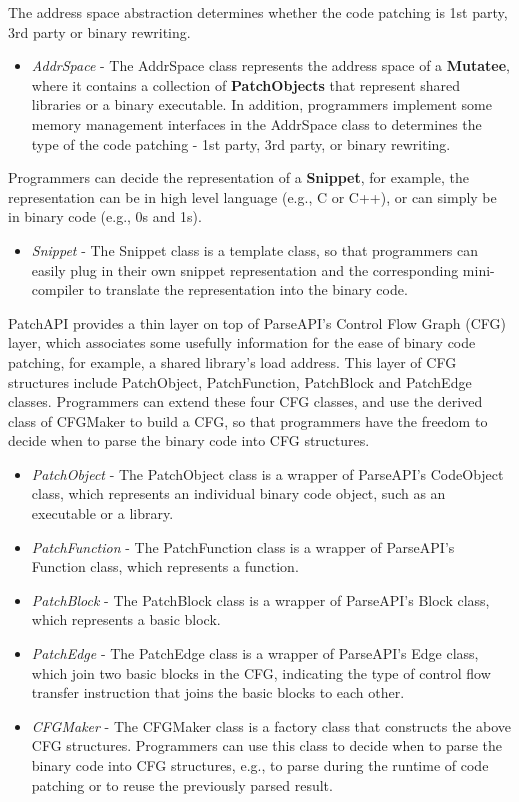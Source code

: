 \documentclass[11pt]{article}
\begin{document}
The address space abstraction determines whether the code patching is 1st party,
3rd party or binary rewriting.
\begin{itemize}
\item \emph{AddrSpace} - The AddrSpace class represents the address space of a
    \textbf{Mutatee}, where it contains a collection of \textbf{PatchObjects} that represent
    shared libraries or a binary executable. In addition, programmers implement
    some memory management interfaces in the AddrSpace class to determines the
    type of the code patching - 1st party, 3rd party, or binary rewriting.
\end{itemize}
Programmers can decide the representation of a \textbf{Snippet}, for example, the
representation can be in high level language (e.g., C or C++), or can simply be
in binary code (e.g., 0s and 1s).
\begin{itemize}
\item \emph{Snippet} - The Snippet class is a template class, so that programmers can
    easily plug in their own snippet representation and the corresponding
    mini-compiler to translate the representation into the binary code.
\end{itemize}
PatchAPI provides a thin layer on top of ParseAPI's Control Flow Graph (CFG)
layer, which associates some usefully information for the ease of binary code
patching, for example, a shared library's load address. This layer of CFG
structures include PatchObject, PatchFunction, PatchBlock and PatchEdge classes.
Programmers can extend these four CFG classes, and use the derived class of
CFGMaker to build a CFG, so that programmers have the freedom to decide when to
parse the binary code into CFG structures.
\begin{itemize}
\item \emph{PatchObject} - The PatchObject class is a wrapper of ParseAPI's CodeObject
    class, which represents an individual binary code object, such as an
    executable or a library.
\item \emph{PatchFunction} - The PatchFunction class is a wrapper of ParseAPI's
    Function class, which represents a function.
\item \emph{PatchBlock} - The PatchBlock class is a wrapper of ParseAPI's Block class,
    which represents a basic block.
\item \emph{PatchEdge} - The PatchEdge class is a wrapper of ParseAPI's Edge class,
    which join two basic blocks in the CFG, indicating the type of control flow
    transfer instruction that joins the basic blocks to each other.
\item \emph{CFGMaker} - The CFGMaker class is a factory class that constructs the above
    CFG structures. Programmers can use this class to decide when to parse the
    binary code into CFG structures, e.g., to parse during the runtime of code
    patching or to reuse the previously parsed result.
\end{itemize}
\end{document}
